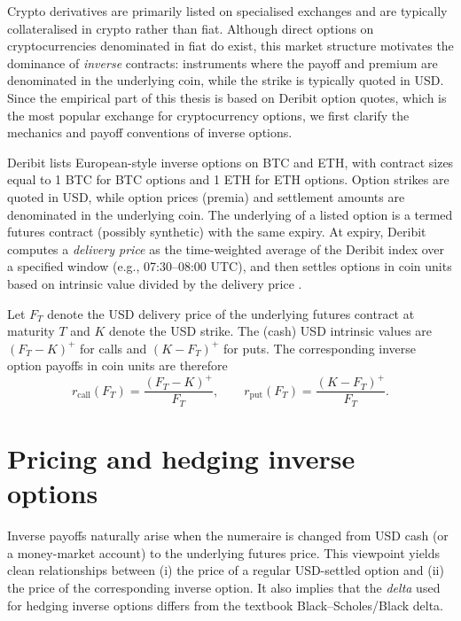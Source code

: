 \documentclass[a4paper,titlepage,12pt]{report}
\theoremstyle{plain}
\begin{document}
Crypto derivatives are primarily listed on specialised exchanges and are typically collateralised in crypto rather than fiat. Although direct options on cryptocurrencies denominated in fiat do exist, this market structure motivates the dominance of \emph{inverse} contracts: instruments where the payoff and premium are denominated in the underlying coin, while the strike is typically quoted in USD. Since the empirical part of this thesis is based on Deribit option quotes, which is the most popular exchange for cryptocurrency options, we first clarify the mechanics and payoff conventions of inverse options.

Deribit lists European-style inverse options on BTC and ETH, with contract sizes equal to 1 BTC for BTC options and 1 ETH for ETH options. Option strikes are quoted in USD, while option prices (premia) and settlement amounts are denominated in the underlying
coin. The underlying of a listed option is a termed futures contract (possibly synthetic) with the same expiry. At expiry, Deribit computes a \emph{delivery price} as the time-weighted average of the Deribit index over a specified window (e.g., 07:30--08:00 UTC), and then settles options in coin units based
on intrinsic value divided by the delivery price \citep{DeribitInverseOptions2025}.

Let $F_T$ denote the USD delivery price of the underlying futures contract at maturity $T$ and $K$ denote the USD strike. The (cash) USD
intrinsic values are $(F_T-K)^+$ for calls and $(K-F_T)^+$ for puts. The corresponding inverse option
payoffs in coin units are therefore
\begin{equation}
r_{\text{call}}(F_T) = \frac{(F_T-K)^+}{F_T}, \qquad
r_{\text{put}}(F_T)  = \frac{(K-F_T)^+}{F_T}.
\label{eq:inverse_payoff_deribit}
\end{equation}

\section{Pricing and hedging inverse options}\label{sec:inverse_pricing}

Inverse payoffs naturally arise when the numeraire is changed from USD cash (or a money-market account) to the underlying futures price. This viewpoint yields clean relationships between (i) the price of a regular USD-settled option and (ii) the price of the corresponding inverse option. It also implies that the \emph{delta} used for hedging inverse options differs from the textbook Black--Scholes/Black delta.
\end{document}
